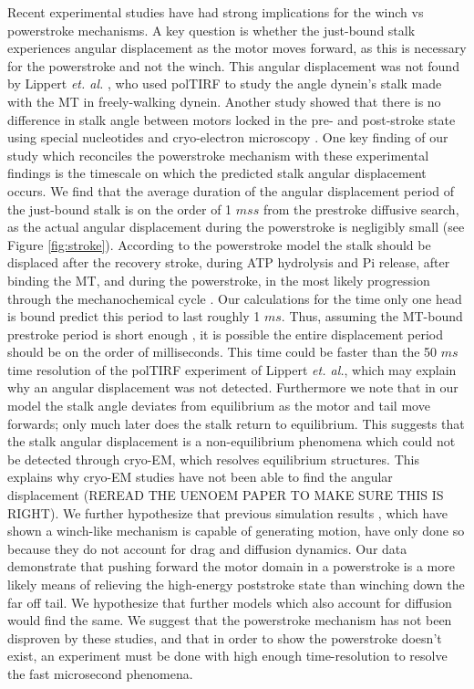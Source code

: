 \documentclass[9pt,twocolumn,twoside]{article}
\begin{document}
Recent experimental studies have had strong implications for the winch vs powerstroke mechanisms. A key question is whether the just-bound stalk experiences angular displacement as the motor moves forward, as this is necessary for the powerstroke and not the winch. This angular displacement was not found by Lippert \textit{et. al.} \cite{lippert}, who used polTIRF to study the angle dynein's stalk made with the MT in freely-walking dynein. Another study showed that there is no difference in stalk angle between motors locked in the pre- and post-stroke state using special nucleotides and cryo-electron microscopy \cite{uenoem}. One key finding of our study which reconciles the powerstroke mechanism with these experimental findings is the timescale on which the predicted stalk angular displacement occurs. We find that the average duration of the angular displacement period of the just-bound stalk is on the order of 1 $ms s$ from the prestroke diffusive search, as the actual angular displacement during the powerstroke is negligibly small (see Figure \ref{fig:stroke}). According to the powerstroke model the stalk should be displaced after the recovery stroke, during ATP hydrolysis and Pi release, after binding the MT, and during the powerstroke, in the most likely progression through the mechanochemical cycle \cite{tsygankovscheme}. Our calculations for the time only one head is bound predict this period to last roughly 1 $ms$. Thus, assuming the MT-bound prestroke period is short enough \cite{mogamirate}, it is possible the entire displacement period should be on the order of milliseconds. This time could be faster than the 50 $ms$ time resolution of the polTIRF experiment of Lippert \textit{et. al.}, which may explain why an angular displacement was not detected. Furthermore we note that in our model the stalk angle deviates from equilibrium as the motor and tail move forwards; only much later does the stalk return to equilibrium. This suggests that the stalk angular displacement is a non-equilibrium phenomena which could not be detected through cryo-EM, which resolves equilibrium structures. This explains why cryo-EM studies have not been able to find the angular displacement \cite{uenoem, nicastro} (REREAD THE UENOEM PAPER TO MAKE SURE THIS IS RIGHT). We further hypothesize that previous simulation results \cite{sarlahmodel}, which have shown a winch-like mechanism is capable of generating motion, have only done so because they do not account for drag and diffusion dynamics. Our data demonstrate that pushing forward the motor domain in a powerstroke is a more likely means of relieving the high-energy poststroke state than winching down the far off tail. We hypothesize that further models which also account for diffusion would find the same. We suggest that the powerstroke mechanism has not been disproven by these studies, and that in order to show the powerstroke doesn't exist, an experiment must be done with high enough time-resolution to resolve the fast microsecond phenomena.
\end{document}
